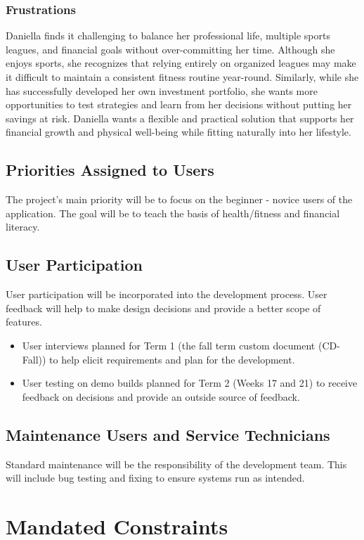 \documentclass[12pt]{article}
\newcommand{\acr}[3]{\phantomsection\label{acr:#1}#2 (#3)}
\begin{document}
\subsubsection*{Frustrations}
Daniella finds it challenging to balance her professional life, multiple sports leagues, and financial goals without over-committing her time. Although she enjoys sports, she recognizes that relying entirely on organized leagues may make it difficult to maintain a consistent fitness routine year-round. Similarly, while she has successfully developed her own investment portfolio, she wants more opportunities to test strategies and learn from her decisions without putting her savings at risk. Daniella wants a flexible and practical solution that supports her financial growth and physical well-being while fitting naturally into her lifestyle.

\subsection{Priorities Assigned to Users}
The project's main priority will be to focus on the beginner - novice users of the application. The goal will be to teach the basis of health/fitness and financial literacy.
\subsection{User Participation}
User participation will be incorporated into the development process. User feedback will help to make design decisions and provide a better scope of features. 
\begin{itemize}
    \item User interviews planned for Term 1 (the fall term \acr{CD}{custom document}{CD-Fall}) to help elicit requirements and plan for the development. 
    \item User testing on demo builds planned for Term 2 (Weeks 17 and 21) to receive feedback on decisions and provide an outside source of feedback.
\end{itemize}
\subsection{Maintenance Users and Service Technicians}
Standard maintenance will be the responsibility of the development team. This will include bug testing and fixing to ensure systems run as intended.  

\section{Mandated Constraints}
\end{document}
